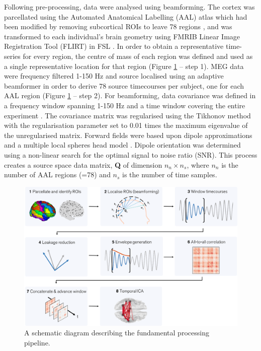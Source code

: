 Following pre-processing, data were analysed using beamforming. The cortex was parcellated using the Automated Anatomical Labelling (AAL) atlas \citep{Tzourio-Mazoyer2002} which had been modified by removing subcortical ROIs to leave 78 regions \citep{Gong2009}, and was transformed to each individual’s brain geometry using FMRIB Linear Image Registration Tool (FLIRT) in FSL \citep{Jenkinson2012}. In order to obtain a representative time-series for every region, the centre of mass of each region was defined and used as a single representative location for that region (Figure \ref{fig_6_1} – step 1). MEG data were frequency filtered 1-150 Hz and source localised using an adaptive beamformer \citep{VanVeen1997, Robinson1999} in order to derive 78 source timecourses per subject, one for each AAL region (Figure \ref{fig_6_1} – step 2). For beamforming, data covariance was defined in a frequency window spanning 1-150 Hz and a time window covering the entire experiment \citep{Brookes2008}. The covariance matrix was regularised using the Tikhonov method with the regularisation parameter set to 0.01 times the maximum eigenvalue of the unregularised matrix. Forward fields were based upon dipole approximations \citep{Sarvas1987} and a multiple local spheres head model \citep{Huang1999}. Dipole orientation was determined using a non-linear search for the optimal signal to noise ratio (SNR). This process creates a source space data matrix, \textbf{Q} of dimension $n_n \times n_s$, where $n_n$ is the number of AAL regions (=78) and $n_s$ is the number of time samples.

\begin{figure}[h!]
\includegraphics[width=\linewidth]{images/chapter6/figure_1.png}\caption{A schematic diagram describing the fundamental processing pipeline.}\label{fig_6_1}
\end{figure}


